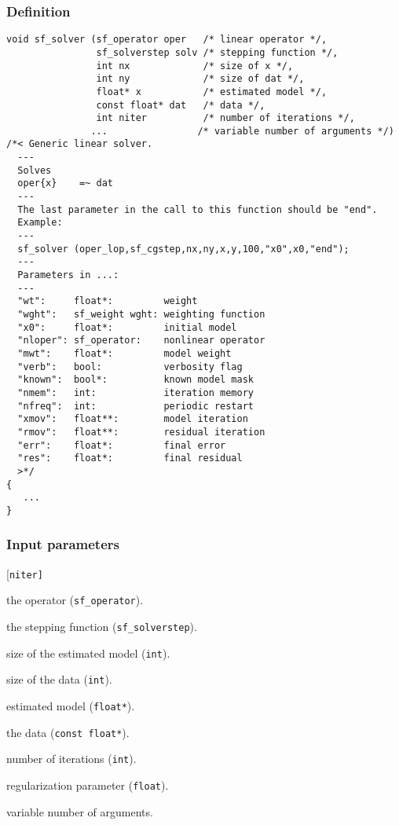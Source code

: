 \subsubsection*{Definition}
\begin{verbatim}
void sf_solver (sf_operator oper   /* linear operator */, 
                sf_solverstep solv /* stepping function */, 
                int nx             /* size of x */, 
                int ny             /* size of dat */, 
                float* x           /* estimated model */, 
                const float* dat   /* data */, 
                int niter          /* number of iterations */, 
               ...                /* variable number of arguments */)
/*< Generic linear solver.
  ---
  Solves
  oper{x}    =~ dat
  ---
  The last parameter in the call to this function should be "end".
  Example: 
  ---
  sf_solver (oper_lop,sf_cgstep,nx,ny,x,y,100,"x0",x0,"end");
  ---
  Parameters in ...:
  ---
  "wt":     float*:         weight      
  "wght":   sf_weight wght: weighting function
  "x0":     float*:         initial model
  "nloper": sf_operator:    nonlinear operator
  "mwt":    float*:         model weight
  "verb":   bool:           verbosity flag
  "known":  bool*:          known model mask
  "nmem":   int:            iteration memory
  "nfreq":  int:            periodic restart
  "xmov":   float**:        model iteration
  "rmov":   float**:        residual iteration
  "err":    float*:         final error
  "res":    float*:         final residual
  >*/ 
{
   ...
}
\end{verbatim}

\subsubsection*{Input parameters}
\begin{desclist}{\tt }{\quad}[\tt niter]
   \setlength\itemsep{0pt}
   \item[oper]  the operator (\texttt{sf\_operator}).
   \item[solv]  the stepping function (\texttt{sf\_solverstep}).  
   \item[nx]    size of the estimated model  (\texttt{int}).  
   \item[ny]    size of the data  (\texttt{int}).  
   \item[x]     estimated model  (\texttt{float*}).  
   \item[dat]   the data (\texttt{const float*}).  
   \item[niter] number of iterations (\texttt{int}).  
   \item[eps]   regularization parameter (\texttt{float}).  
   \item[...]   variable number of arguments.
\end{desclist}




